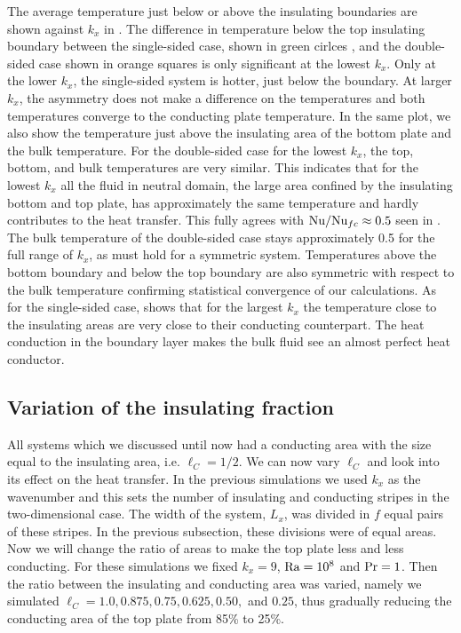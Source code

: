 The average temperature just below or above the insulating boundaries are
shown against $k_x$ in .  The difference in temperature
below the top insulating boundary between the single-sided case, shown in
green cirlces , and the double-sided case shown in orange squares is only
significant at the lowest $k_x$.  Only at the lower $k_x$, the single-sided
system is hotter, just below the boundary.  At larger $k_x$, the asymmetry
does not make a difference on the temperatures and both temperatures converge
to the conducting plate temperature.  In the same plot, we also show the
temperature just above the insulating area of the bottom plate and the bulk
temperature.  For the double-sided case for the lowest $k_x$, the top, bottom,
and bulk temperatures are very similar.  This indicates that for the lowest
$k_x$ all the fluid in neutral domain, the large area confined by the
insulating bottom and top plate, has approximately the same temperature and
hardly contributes to the heat transfer.  This fully agrees with
$\text{Nu}/\text{Nu}_{fc}\approx 0.5$ seen in .  The bulk
temperature of the double-sided case stays approximately 0.5 for the full
range of $k_x$, as must hold for a symmetric system.  Temperatures above the
bottom boundary and below the top boundary are also symmetric with respect to
the bulk temperature confirming statistical convergence of our calculations.
As for the single-sided case,  shows that for the largest
$k_x$ the temperature close to the insulating areas are very close to their
conducting counterpart.  The heat conduction in the boundary layer makes the
bulk fluid see an almost perfect heat conductor.

%
\subsection{Variation of the insulating fraction}\label{VariationFraction} All
systems which we discussed until now had a conducting area with the size equal
to the insulating area, i.e. $\ell_C = 1/2$.  We can now vary $\ell_C$ and
look into its effect on the heat transfer.  In the previous simulations we
used $k_x$ as the wavenumber and this sets the number of insulating and
conducting stripes in the two-dimensional case.  The width of the system,
$L_x$, was divided in $f$ equal pairs of these stripes.  In the previous
subsection, these divisions were of equal areas.  Now we will change the ratio
of areas to make the top plate less and less conducting.  For these
simulations we fixed $k_x = 9$, $\text{Ra}=10^8$ and $\text{Pr}=1$.  Then the ratio
between the insulating and conducting area was varied, namely we simulated
$\ell_C = 1.0, 0.875, 0.75, 0.625, 0.50,$ and $0.25$, thus gradually reducing
the conducting area of the top plate from 85\% to 25\%.

